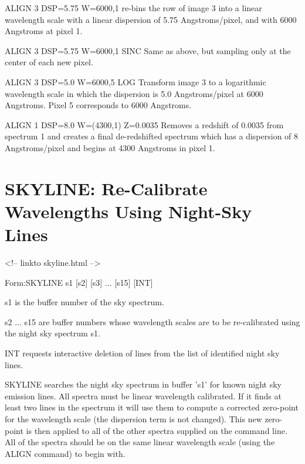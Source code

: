 \begin{example} 
  \item[ALIGN 3 DSP=5.75 W=6000,1\hfill]{re-bins the row of image 3 into a
       linear wavelength scale with a linear dispersion of 5.75
       Angstroms/pixel, and with 6000 Angstroms at pixel 1.}

  \item[ALIGN 3 DSP=5.75 W=6000,1 SINC\hfill]{Same as above, but sampling
       only at the center of each new pixel.}

  \item[ALIGN 3 DSP=5.0 W=6000,5 LOG\hfill]{Transform image 3 to a
       logarithmic wavelength scale in which the dispersion is 5.0
       Angstroms/pixel at 6000 Angstroms.  Pixel 5 corresponds to 6000
       Angstroms.}

  \item[ALIGN 1 DSP=8.0 W=(4300,1) Z=0.0035\hfill]{ Removes a redshift of
       0.0035 from spectrum 1 and creates a final de-redshifted spectrum
       which has a dispersion of 8 Angstroms/pixel and begins at 4300
       Angstroms in pixel 1.}
\end{example}
 
\section{SKYLINE: Re-Calibrate Wavelengths Using Night-Sky Lines}
\begin{rawhtml}
<!-- linkto skyline.html -->
\end{rawhtml}
\begin{command}
  \item[Form:SKYLINE s1 {[s2]} {[s3]} ... {[s15]} {[INT]}\hfill]{}
  \item[s1]{is the buffer number of the sky spectrum.}
  \item[s2 ... s15]{are buffer numbers whose wavelength
       scales are to be re-calibrated using the night sky spectrum s1.}
  \item[INT]{requests interactive deletion of lines
       from the list of identified night sky lines.}
\end{command}

SKYLINE searches the night sky spectrum in buffer 's1' for known night sky
emission lines.  All spectra must be linear wavelength calibrated. If it
finds at least two lines in the spectrum it will use them to compute a
corrected zero-point for the wavelength scale (the dispersion term is not
changed).  This new zero-point is then applied to all of the other spectra
supplied on the command line.  All of the spectra should be on the same
linear wavelength scale (using the ALIGN command) to begin with.

